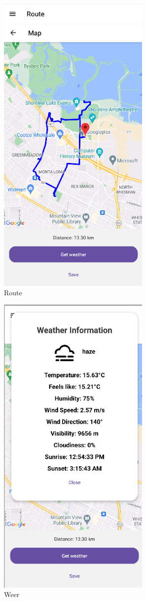     \begin{figure}[H]
        \includegraphics[width=20em]{./graphics/route.png}
        \centering
        \caption{Route}
        \label{fig:route}
    \end{figure}

    \begin{figure}[H]
        \includegraphics[width=20em]{./graphics/weather.png}
        \centering
        \caption{Weer}
        \label{fig:weather}
    \end{figure}

